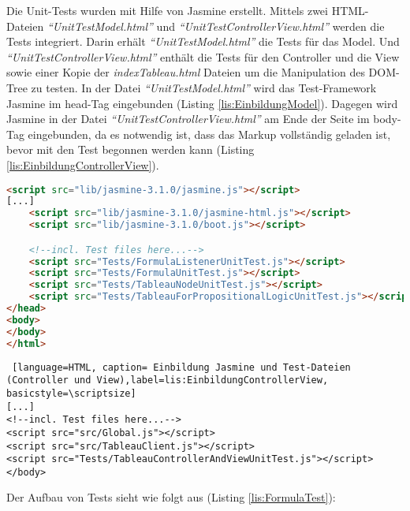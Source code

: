 Die Unit-Tests wurden mit Hilfe von Jasmine erstellt.  Mittels zwei HTML-Dateien  \textit{``UnitTestModel.html''} und \textit{``UnitTestControllerView.html''} werden die Tests integriert. Darin erhält \textit{``UnitTestModel.html''} die Tests für das Model. Und \textit{``UnitTestControllerView.html''} enthält die Tests für den Controller und die View sowie einer Kopie der \textit{indexTableau.html} Dateien um die Manipulation des DOM-Tree zu testen. In der Datei \textit{``UnitTestModel.html''} wird das Test-Framework Jasmine im head-Tag eingebunden (Listing \ref{lis:EinbildungModel}). Dagegen wird Jasmine in der Datei \textit{``UnitTestControllerView.html''} am Ende der Seite im  body-Tag eingebunden, da es notwendig ist, dass das Markup vollständig geladen ist, bevor mit den Test begonnen werden kann (Listing \ref{lis:EinbildungControllerView}).
\begin{lstlisting}[language=HTML, caption= Einbildung Jasmine und Test-Dateien (Model), label=lis:EinbildungModel,basicstyle=\scriptsize]
<script src="lib/jasmine-3.1.0/jasmine.js"></script>
[...]
    <script src="lib/jasmine-3.1.0/jasmine-html.js"></script>
    <script src="lib/jasmine-3.1.0/boot.js"></script>

    <!--incl. Test files here...-->
    <script src="Tests/FormulaListenerUnitTest.js"></script>
    <script src="Tests/FormulaUnitTest.js"></script>
    <script src="Tests/TableauNodeUnitTest.js"></script>
    <script src="Tests/TableauForPropositionalLogicUnitTest.js"></script>
</head>
<body>
</body>
</html>
\end{lstlisting}

\begin{lstlisting} [language=HTML, caption= Einbildung Jasmine und Test-Dateien (Controller und View),label=lis:EinbildungControllerView, basicstyle=\scriptsize]
[...]
<!--incl. Test files here...-->
<script src="src/Global.js"></script>
<script src="src/TableauClient.js"></script>
<script src="Tests/TableauControllerAndViewUnitTest.js"></script>
</body>
\end{lstlisting}

Der Aufbau von Tests sieht wie folgt aus (Listing \ref{lis:FormulaTest}):

